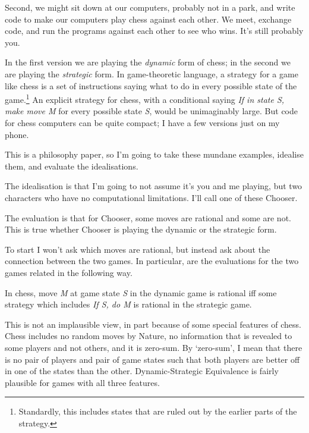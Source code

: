 \documentclass[
  10pt,
  letterpaper,
  DIV=11,
  numbers=noendperiod,
  twoside]{scrartcl}
\providecommand{\tightlist}{%
  \setlength{\itemsep}{0pt}\setlength{\parskip}{0pt}}\usepackage{longtable,booktabs,array}
\begin{document}
Second, we might sit down at our computers, probably not in a park, and
write code to make our computers play chess against each other. We meet,
exchange code, and run the programs against each other to see who wins.
It's still probably you.

In the first version we are playing the \emph{dynamic} form of chess; in
the second we are playing the \emph{strategic} form. In game-theoretic
language, a strategy for a game like chess is a set of instructions
saying what to do in every possible state of the game.\footnote{Standardly,
  this includes states that are ruled out by the earlier parts of the
  strategy.} An explicit strategy for chess, with a conditional saying
\emph{If in state S, make move M} for every possible state \emph{S},
would be unimaginably large. But code for chess computers can be quite
compact; I have a few versions just on my phone.

This is a philosophy paper, so I'm going to take these mundane examples,
idealise them, and evaluate the idealisations.

The idealisation is that I'm going to not assume it's you and me
playing, but two characters who have no computational limitations. I'll
call one of these Chooser.

The evaluation is that for Chooser, some moves are rational and some are
not. This is true whether Chooser is playing the dynamic or the
strategic form.

To start I won't ask which moves are rational, but instead ask about the
connection between the two games. In particular, are the evaluations for
the two games related in the following way.

\begin{description}
\tightlist
\item[Dynamic-Strategic Equivalance (for chess)]
In chess, move \emph{M} at game state \emph{S} in the dynamic game is
rational iff some strategy which includes \emph{If S, do M} is rational
in the strategic game.
\end{description}

This is not an implausible view, in part because of some special
features of chess. Chess includes no random moves by Nature, no
information that is revealed to some players and not others, and it is
zero-sum. By `zero-sum', I mean that there is no pair of players and
pair of game states such that both players are better off in one of the
states than the other. Dynamic-Strategic Equivalence is fairly plausible
for games with all three features.
\end{document}

